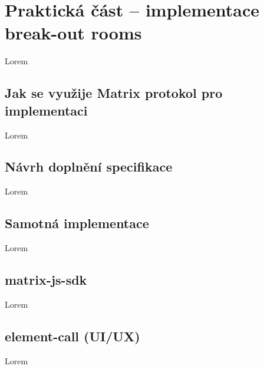 \section{Praktická část -- implementace break-out rooms}\label{breakoutRooms}

Lorem

\subsection{Jak se využije Matrix protokol pro implementaci}

Lorem

\subsection{Návrh doplnění specifikace}

Lorem

\subsection{Samotná implementace}

Lorem

\subsection{matrix-js-sdk}

Lorem

\subsection{element-call (UI/UX) }

Lorem
